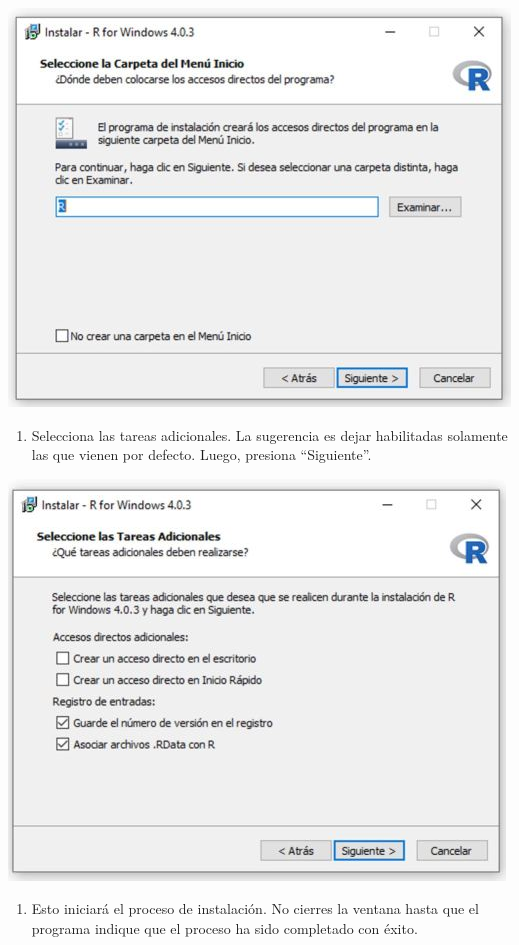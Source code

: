 \documentclass[
]{book}
\providecommand{\tightlist}{%
  \setlength{\itemsep}{0pt}\setlength{\parskip}{0pt}}
\begin{document}
\includegraphics{data/12.png}

\begin{enumerate}
\def\labelenumi{\arabic{enumi}.}
\setcounter{enumi}{12}
\tightlist
\item
  Selecciona las tareas adicionales. La sugerencia es dejar habilitadas solamente las que vienen por defecto. Luego, presiona ``Siguiente''.
\end{enumerate}

\includegraphics{data/13.png}

\begin{enumerate}
\def\labelenumi{\arabic{enumi}.}
\setcounter{enumi}{13}
\tightlist
\item
  Esto iniciará el proceso de instalación. No cierres la ventana hasta que el programa indique que el proceso ha sido completado con éxito.
\end{enumerate}
\end{document}
